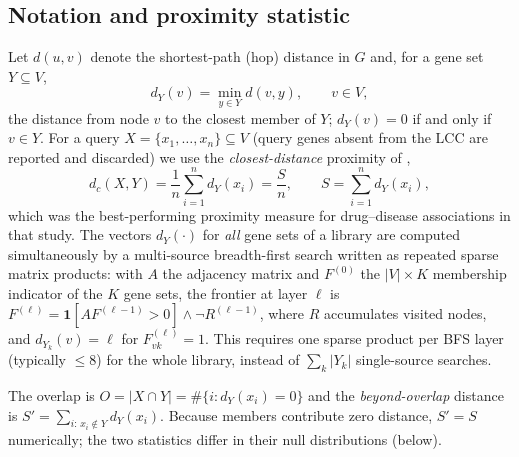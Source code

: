 \subsection{Notation and proximity statistic}
Let $d(u, v)$ denote the shortest-path (hop) distance in $G$ and, for a gene set $Y \subseteq V$,
\begin{equation}
d_Y(v) = \min_{y \in Y} d(v, y), \qquad v \in V,
\end{equation}
the distance from node $v$ to the closest member of $Y$; $d_Y(v) = 0$ if and only if $v \in Y$. For a query $X = \{x_1, \dots, x_n\} \subseteq V$ (query genes absent from the LCC are reported and discarded) we use the \emph{closest-distance} proximity of \citet{Guney2016},
\begin{equation}
d_c(X, Y) = \frac{1}{n}\sum_{i=1}^{n} d_Y(x_i) = \frac{S}{n}, \qquad S = \sum_{i=1}^{n} d_Y(x_i),
\label{eq:dc}
\end{equation}
which was the best-performing proximity measure for drug--disease associations in that study. The vectors $d_Y(\cdot)$ for \emph{all} gene sets of a library are computed simultaneously by a multi-source breadth-first search written as repeated sparse matrix products: with $A$ the adjacency matrix and $F^{(0)}$ the $|V| \times K$ membership indicator of the $K$ gene sets, the frontier at layer $\ell$ is $F^{(\ell)} = \mathbf{1}[A F^{(\ell-1)} > 0] \wedge \neg R^{(\ell-1)}$, where $R$ accumulates visited nodes, and $d_{Y_k}(v) = \ell$ for $F^{(\ell)}_{vk} = 1$. This requires one sparse product per BFS layer (typically $\le 8$) for the whole library, instead of $\sum_k |Y_k|$ single-source searches.

The overlap is $O = |X \cap Y| = \#\{i : d_Y(x_i) = 0\}$ and the \emph{beyond-overlap} distance is $S' = \sum_{i:\, x_i \notin Y} d_Y(x_i)$. Because members contribute zero distance, $S' = S$ numerically; the two statistics differ in their null distributions (below).

